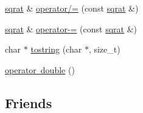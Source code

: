 \begin{DoxyCompactItemize}
\item 
\mbox{\hyperlink{classsqrat}{sqrat}} \& \mbox{\hyperlink{classsqrat_a348781af63f0a423ad0a84342fdccb49}{operator/=}} (const \mbox{\hyperlink{classsqrat}{sqrat}} \&)
\item 
\mbox{\hyperlink{classsqrat}{sqrat}} \& \mbox{\hyperlink{classsqrat_a774a997c67358fea54d41cd8f29bdd3a}{operator-\/=}} (const \mbox{\hyperlink{classsqrat}{sqrat}} \&)
\item 
char $\ast$ \mbox{\hyperlink{classsqrat_a0e94b27cf419cf8888da52e854f9d60b}{tostring}} (char $\ast$, size\+\_\+t)
\item 
\mbox{\hyperlink{classsqrat_af1d90ee59e36a87aa7a94dacdab875de}{operator double}} ()
\end{DoxyCompactItemize}
\subsection*{Friends}
